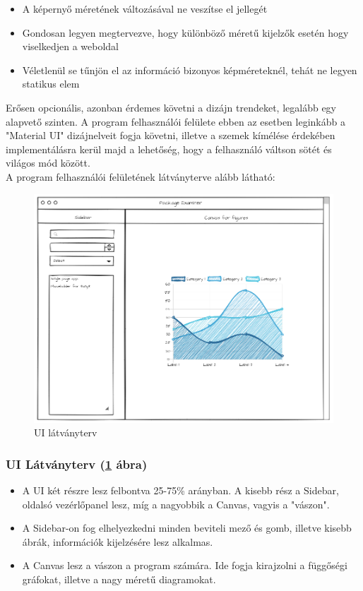 \begin{itemize}
	\item A képernyő méretének változásával ne veszítse el jellegét
	\item Gondosan legyen megtervezve, hogy különböző méretű kijelzők esetén hogy viselkedjen a weboldal
	\item Véletlenül se tűnjön el az információ bizonyos képméreteknél, tehát ne legyen statikus elem
\end{itemize}

Erősen opcionális, azonban érdemes követni a dizájn trendeket, legalább egy alapvető szinten. A program felhasználói felülete ebben az esetben leginkább a "Material UI" dizájnelveit fogja követni, illetve a szemek kímélése érdekében implementálásra kerül majd a lehetőség, hogy a felhasználó váltson sötét és világos mód között.\\

A program felhasználói felületének látványterve alább látható:

\begin{figure}[!h]
	\centering
	\includegraphics[scale=0.5]{images/ui_plan.png}
	\caption{UI látványterv}
	\label{fig:ui_plan}
\end{figure}

\pagebreak

\subsubsection{UI Látványterv (\ref{fig:ui_plan} ábra)}
\begin{itemize}
	\item A UI két részre lesz felbontva 25-75\% arányban.  A kisebb rész a Sidebar, oldalsó vezérlőpanel lesz, míg a nagyobbik a Canvas, vagyis a "vászon".
	\item A Sidebar-on fog elhelyezkedni minden beviteli mező és gomb, illetve kisebb ábrák, információk kijelzésére lesz alkalmas.
	\item A Canvas lesz a vászon a program számára. Ide fogja kirajzolni a függőségi gráfokat, illetve a nagy méretű diagramokat.
\end{itemize}

